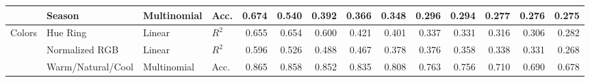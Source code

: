 \begin{table}[htbp]
{\begin{tabular}{ll ll rrrrrrrrrr}
 & Season & Multinomial & Acc. & 0.674 & 0.540 & 0.392 & 0.366 & 0.348 & 0.296 & 0.294 & 0.277 & 0.276 & 0.275 \\
\midrule
\multirow{3}{*}{Colors} & Hue Ring & Linear & $R^2$ & 0.655 & 0.654 & 0.600 & 0.421 & 0.401 & 0.337 & 0.331 & 0.316 & 0.306 & 0.282 \\
 & Normalized RGB & Linear & $R^2$ & 0.596 & 0.526 & 0.488 & 0.467 & 0.378 & 0.376 & 0.358 & 0.338 & 0.331 & 0.268 \\
 & Warm/Natural/Cool & Multinomial & Acc. & 0.865 & 0.858 & 0.852 & 0.835 & 0.808 & 0.763 & 0.756 & 0.710 & 0.690 & 0.678 \\
\bottomrule
\end{tabular}}%
\end{table}
